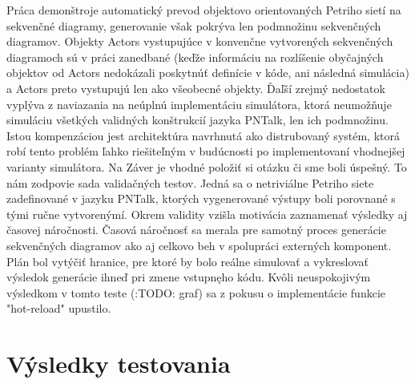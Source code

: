 Práca demonštroje automatický prevod objektovo orientovaných Petriho sietí na sekvenčné diagramy, generovanie však pokrýva len podmnožinu sekvenčných diagramov. Objekty Actors vystupujúce v konvenčne vytvorených sekvenčných diagramoch sú v práci zanedbané (keďže informáciu na rozlíšenie obyčajných objektov od Actors nedokázali poskytnúť definície v kóde, ani následná simulácia) a Actors preto vystupujú len ako všeobecné objekty. Ďaľší zrejmý nedostatok vyplýva z naviazania na neúplnú implementáciu simulátora, ktorá neumožňuje simuláciu všetkých validných konštrukcií jazyka PNTalk, len ich podmnožinu. Istou kompenzáciou jest architektúra navrhnutá ako distrubovaný systém, ktorá robí tento problém ľahko riešiteľným v budúcnosti po implementovaní vhodnejšej varianty simulátora. Na Záver je vhodné položiť si otázku či sme boli úspešný.
To nám zodpovie sada validačných testov. Jedná sa o netriviálne Petriho siete zadefinované v jazyku PNTalk, ktorých vygenerované výstupy boli porovnané s tými ručne vytvorenýmí. Okrem validity vzišla motivácia zaznamenať výsledky aj časovej náročnosti. Časová náročnosť sa merala pre samotný proces generácie sekvenčných diagramov ako aj celkovo beh v spolupráci externých komponent. Plán bol vytýčiť hranice, pre ktoré by bolo reálne simulovať a vykreslovať výsledok generácie ihneď pri zmene vstupnęho kódu. Kvôli neuspokojivým výsledkom v tomto teste (:TODO: graf) sa z pokusu o implementácie funkcie "hot-reload" upustilo. 

\section{Výsledky testovania}




 

